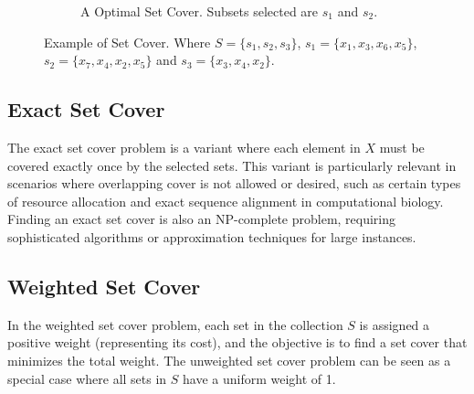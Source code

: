 \begin{figure}[!ht]
\begin{subfigure}{0.45\textwidth}
{\begin{circuitikz}
            \end{circuitikz}
            }%
            \caption{A Optimal Set Cover. Subsets selected are $s_1$ and $s_2$.} 
            \label{fig:set_cover_2}
        \end{subfigure}
        \caption{Example of Set Cover. Where $S=\{s_1, s_2, s_3\}$, $s_1=\{x_1, x_3, x_6, x_5\}$, $s_2=\{x_7, x_4, x_2, x_5\}$ and $s_3=\{x_3, x_4, x_2\}$.} 
        \label{fig:set_cover}
    \end{figure}


    \subsection{Exact Set Cover}
    The exact set cover problem is a variant where each element in $X$ must be covered exactly once by the selected sets. This variant is particularly relevant in scenarios where overlapping cover is not allowed or desired, such as certain types of resource allocation and exact sequence alignment in computational biology. Finding an exact set cover is also an NP-complete problem, requiring sophisticated algorithms or approximation techniques for large instances.
    
    \subsection{Weighted Set Cover}
    In the weighted set cover problem, each set in the collection $S$ is assigned a positive weight (representing its cost), and the objective is to find a set cover that minimizes the total weight. The unweighted set cover problem can be seen as a special case where all sets in $S$ have a uniform weight of 1.
    
